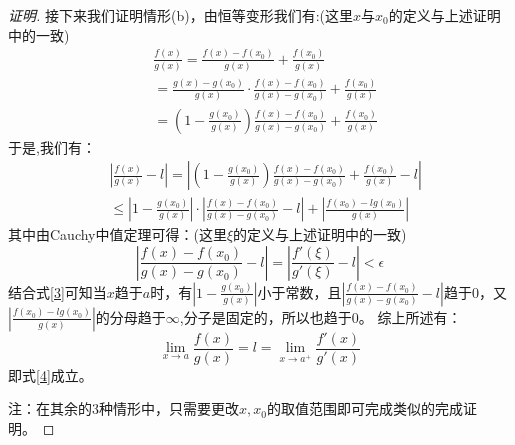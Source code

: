 \documentclass{ctexart}
\begin{document}
\begin{proof}[证明]
接下来我们证明情形(b)，由恒等变形我们有:(这里$x$与$x_0$的定义与上述证明中的一致)
\begin{equation}
\begin{aligned}
&\frac{f(x)}{g(x)}=\frac{f(x)-f(x_0)}{g(x)}+\frac{f(x_0)}{g(x)}\\
&=\frac{g(x)-g(x_0)}{g(x)}\cdot\frac{f(x)-f(x_0)}{g(x)-g(x_0)}+\frac{f(x_0)}{g(x)}\\
&=\left(1-\frac{g(x_0)}{g(x)}\right)\frac{f(x)-f(x_0)}{g(x)-g(x_0)}+\frac{f(x_0)}{g(x)}\nonumber
\end{aligned}
\end{equation}
于是,我们有：
\begin{equation}
	\begin{aligned}
		&\left|\frac{f(x)}{g(x)}-l\right|=\left|\left(1-\frac{g(x_0)}{g(x)}\right)\frac{f(x)-f(x_0)}{g(x)-g(x_0)}+\frac{f(x_0)}{g(x)}-l\right|\\
		&\le\left|1-\frac{g(x_0)}{g(x)}\right|\cdot\left|\frac{f(x)-f(x_0)}{g(x)-g(x_0)}-l\right|+\left|\frac{f(x_0)-lg(x_0)}{g(x)}\right|\label{6}
	\end{aligned}
\end{equation}
其中由Cauchy中值定理可得：(这里$\xi$的定义与上述证明中的一致)
$$
\left|\frac{f(x)-f(x_0)}{g(x)-g(x_0)}-l\right|=\left|\frac{f'(\xi)}{g'(\xi)}-l\right|<\epsilon
$$
结合式\ref{3}可知当$x$趋于$a$时，有$\displaystyle\left|1-\frac{g(x_0)}{g(x)}\right|$小于常数，且$\displaystyle\left|\frac{f(x)-f(x_0)}{g(x)-g(x_0)}-l\right|$趋于$0$，又$\displaystyle\left|\frac{f(x_0)-lg(x_0)}{g(x)}\right|$的分母趋于$\infty$,分子是固定的，所以也趋于$0$。
综上所述有：
\begin{equation}
	\lim_{x \rightarrow a}\frac{f(x)}{g(x)}=l=\lim_{x \rightarrow a^+}\frac{f'(x)}{g'(x)}\nonumber
\end{equation}
即式\ref{4}成立。

注：在其余的3种情形中，只需要更改$x,x_0$的取值范围即可完成类似的完成证明。
\end{proof}
\end{document}
